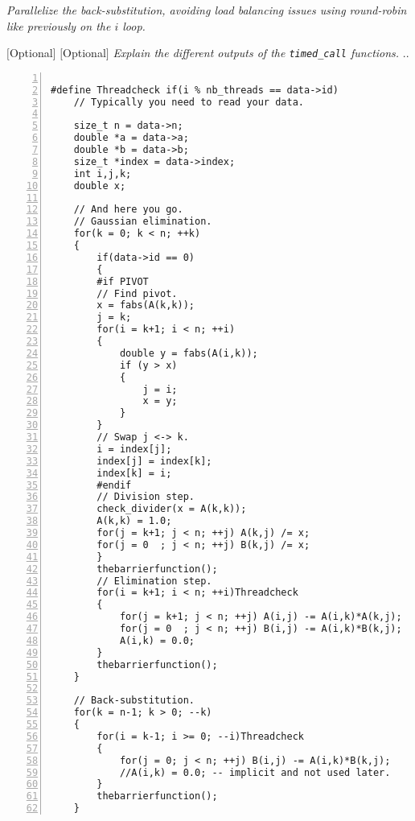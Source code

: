 \documentclass{article}
\begin{document}
\begin{ExerciseList}
\Exercise
{}
\Question \emph{Parallelize the back-substitution, avoiding load
  balancing issues using round-robin like previously on the $i$ loop.}

\Exercise $[$Optional$]$
\Question $[$Optional$]$ \emph{Explain the different outputs of the
  \texttt{timed\_call} functions.}
\Answer .. %

\end{ExerciseList}

\begin{lstlisting}[basicstyle=\small\sffamily,
keywords={break,case,const,continue,default,else,enum,
for,if,return,switch,while,do,long,void,int,float,double,
char,struct,typedef,include,size\_t},
keywordstyle={\color{blue}},
comment={[l]{//}}, morecomment={[s]{/*}{*/}}, commentstyle=\itshape,
columns={[l]flexible}, numbers=left, numberstyle=\tiny,
frameround=fftt, frame=shadowbox, captionpos=b,
caption={Matrix inversion with semaphores.},
label=LST:invmat1]

#define Threadcheck if(i % nb_threads == data->id)
    // Typically you need to read your data.

    size_t n = data->n;
    double *a = data->a;
    double *b = data->b;
    size_t *index = data->index;
    int i,j,k;
    double x;

    // And here you go.
	// Gaussian elimination.
    for(k = 0; k < n; ++k)
    {
		if(data->id == 0)
		{
		#if PIVOT
        // Find pivot.
        x = fabs(A(k,k));
        j = k;
        for(i = k+1; i < n; ++i)
        {
            double y = fabs(A(i,k));
            if (y > x)
            {
                j = i;
                x = y;
            }
        }
        // Swap j <-> k.
        i = index[j];
        index[j] = index[k];
        index[k] = i;
		#endif
        // Division step.
        check_divider(x = A(k,k));
        A(k,k) = 1.0;
        for(j = k+1; j < n; ++j) A(k,j) /= x;
        for(j = 0  ; j < n; ++j) B(k,j) /= x;
		}
		thebarrierfunction();
        // Elimination step.
        for(i = k+1; i < n; ++i)Threadcheck
        {
            for(j = k+1; j < n; ++j) A(i,j) -= A(i,k)*A(k,j);
            for(j = 0  ; j < n; ++j) B(i,j) -= A(i,k)*B(k,j);
            A(i,k) = 0.0;
        }
		thebarrierfunction();
    }

    // Back-substitution.
    for(k = n-1; k > 0; --k)
    {
        for(i = k-1; i >= 0; --i)Threadcheck
        {
            for(j = 0; j < n; ++j) B(i,j) -= A(i,k)*B(k,j);
            //A(i,k) = 0.0; -- implicit and not used later.
        }
		thebarrierfunction();
    }
\end{lstlisting}
\end{document}
